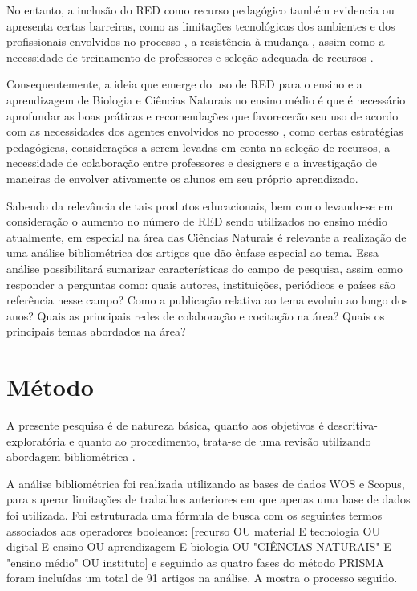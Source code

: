 \documentclass[portuguese]{textolivre}
\begin{document}
No entanto, a inclusão do RED como recurso pedagógico também evidencia ou apresenta certas barreiras, como as limitações tecnológicas dos ambientes e dos profissionais envolvidos no processo \cite{fernandez_rio_brecha_2022}, a resistência à mudança \cite{corica_resistencia_2020}, assim como a necessidade de treinamento de professores \cite{rego-agraso_visiones_2019} e seleção adequada de recursos \cite{herrero_vazquez_revision_2020}.

Consequentemente, a ideia que emerge do uso de RED para o ensino e a aprendizagem de Biologia e Ciências Naturais no ensino médio é que é necessário aprofundar as boas práticas e recomendações que favorecerão seu uso de acordo com as necessidades dos agentes envolvidos no processo \cite{couch_scientific_2015,area-moreira_tecnologias_2021}, como certas estratégias pedagógicas, considerações a serem levadas em conta na seleção de recursos, a necessidade de colaboração entre professores e designers e a investigação de maneiras de envolver ativamente os alunos em seu próprio aprendizado.

Sabendo da relevância de tais produtos educacionais, bem como levando-se em consideração o aumento no número de RED sendo utilizados no ensino médio atualmente, em especial na área das Ciências Naturais \cite{carvalho_tecnologias_2019} é relevante a realização de uma análise bibliométrica dos artigos que dão ênfase especial ao tema. Essa análise possibilitará sumarizar características do campo de pesquisa, assim como responder a perguntas como: quais autores, instituições, periódicos e países são referência nesse campo? Como a publicação relativa ao tema evoluiu ao longo dos anos? Quais as principais redes de colaboração e cocitação na área? Quais os principais temas abordados na área?


\section{Método}
A presente pesquisa é de natureza básica, quanto aos objetivos é descritiva-exploratória e quanto ao procedimento, trata-se de uma revisão utilizando abordagem bibliométrica \cite{prodanov_metodologia_2013}.

A análise bibliométrica foi realizada utilizando as bases de dados WOS e Scopus, para superar limitações de trabalhos anteriores em que apenas uma base de dados foi utilizada. Foi estruturada uma fórmula de busca com os seguintes termos associados aos operadores booleanos: [recurso OU material E tecnologia OU digital E ensino OU aprendizagem E biologia OU "CIÊNCIAS NATURAIS" E "ensino médio" OU instituto] e seguindo as quatro fases do método PRISMA \cite{page_introduction_2022} foram incluídas um total de 91 artigos na análise. A  mostra o processo seguido.
\end{document}
